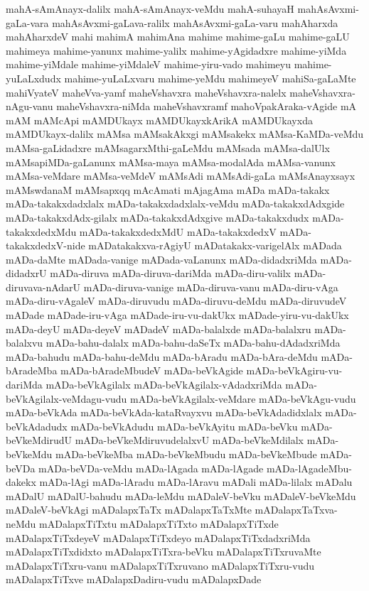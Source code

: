 {mahA-sAmAnayx-dalilx
mahA-sAmAnayx-veMdu
mahA-suhayaH
mahAsAvxmi-gaLa-vara
mahAsAvxmi-gaLava-ralilx
mahAsAvxmi-gaLa-varu
mahAharxda
mahAharxdeV
mahi
mahimA
mahimAna
mahime
mahime-gaLu
mahime-gaLU
mahimeya
mahime-yanunx
mahime-yalilx
mahime-yAgidadxre
mahime-yiMda
mahime-yiMdale
mahime-yiMdaleV
mahime-yiru-vado
mahimeyu
mahime-yuLaLxdudx
mahime-yuLaLxvaru
mahime-yeMdu
mahimeyeV
mahiSa-gaLaMte
mahiVyateV
maheVva-yamf
maheVshavxra
maheVshavxra-nalelx
maheVshavxra-nAgu-vanu
maheVshavxra-niMda
maheVshavxramf
mahoVpakAraka-vAgide
mA
mAM
mAMcApi
mAMDUkayx
mAMDUkayxkArikA
mAMDUkayxda
mAMDUkayx-dalilx
mAMsa
mAMsakAkxgi
mAMsakekx
mAMsa-KaMDa-veMdu
mAMsa-gaLidadxre
mAMsagarxMthi-gaLeMdu
mAMsada
mAMsa-dalUlx
mAMsapiMDa-gaLanunx
mAMsa-maya
mAMsa-modalAda
mAMsa-vanunx
mAMsa-veMdare
mAMsa-veMdeV
mAMsAdi
mAMsAdi-gaLa
mAMsAnayxsayx
mAMswdanaM
mAMsapxqq
mAcAmati
mAjagAma
mADa
mADa-takakx
mADa-takakxdadxlalx
mADa-takakxdadxlalx-veMdu
mADa-takakxdAdxgide
mADa-takakxdAdx-gilalx
mADa-takakxdAdxgive
mADa-takakxdudx
mADa-takakxdedxMdu
mADa-takakxdedxMdU
mADa-takakxdedxV
mADa-takakxdedxV-nide
mADatakakxva-rAgiyU
mADatakakx-varigelAlx
mADada
mADa-daMte
mADada-vanige
mADada-vaLanunx
mADa-didadxriMda
mADa-didadxrU
mADa-diruva
mADa-diruva-dariMda
mADa-diru-valilx
mADa-diruvava-nAdarU
mADa-diruva-vanige
mADa-diruva-vanu
mADa-diru-vAga
mADa-diru-vAgaleV
mADa-diruvudu
mADa-diruvu-deMdu
mADa-diruvudeV
mADade
mADade-iru-vAga
mADade-iru-vu-dakUkx
mADade-yiru-vu-dakUkx
mADa-deyU
mADa-deyeV
mADadeV
mADa-balalxde
mADa-balalxru
mADa-balalxvu
mADa-bahu-dalalx
mADa-bahu-daSeTx
mADa-bahu-dAdadxriMda
mADa-bahudu
mADa-bahu-deMdu
mADa-bAradu
mADa-bAra-deMdu
mADa-bAradeMba
mADa-bAradeMbudeV
mADa-beVkAgide
mADa-beVkAgiru-vu-dariMda
mADa-beVkAgilalx
mADa-beVkAgilalx-vAdadxriMda
mADa-beVkAgilalx-veMdagu-vudu
mADa-beVkAgilalx-veMdare
mADa-beVkAgu-vudu
mADa-beVkAda
mADa-beVkAda-kataRvayxvu
mADa-beVkAdadidxlalx
mADa-beVkAdadudx
mADa-beVkAdudu
mADa-beVkAyitu
mADa-beVku
mADa-beVkeMdirudU
mADa-beVkeMdiruvudelalxvU
mADa-beVkeMdilalx
mADa-beVkeMdu
mADa-beVkeMba
mADa-beVkeMbudu
mADa-beVkeMbude
mADa-beVDa
mADa-beVDa-veMdu
mADa-lAgada
mADa-lAgade
mADa-lAgadeMbu-dakekx
mADa-lAgi
mADa-lAradu
mADa-lAravu
mADali
mADa-lilalx
mADalu
mADalU
mADalU-bahudu
mADa-leMdu
mADaleV-beVku
mADaleV-beVkeMdu
mADaleV-beVkAgi
mADalapxTaTx
mADalapxTaTxMte
mADalapxTaTxva-neMdu
mADalapxTiTxtu
mADalapxTiTxto
mADalapxTiTxde
mADalapxTiTxdeyeV
mADalapxTiTxdeyo
mADalapxTiTxdadxriMda
mADalapxTiTxdidxto
mADalapxTiTxra-beVku
mADalapxTiTxruvaMte
mADalapxTiTxru-vanu
mADalapxTiTxruvano
mADalapxTiTxru-vudu
mADalapxTiTxve
mADalapxDadiru-vudu
mADalapxDade
}
